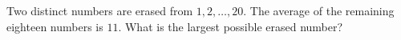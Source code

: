 Two distinct numbers are erased from $1,2,\ldots,20$. The average of the remaining eighteen numbers is $11$. What is the largest possible erased number?
